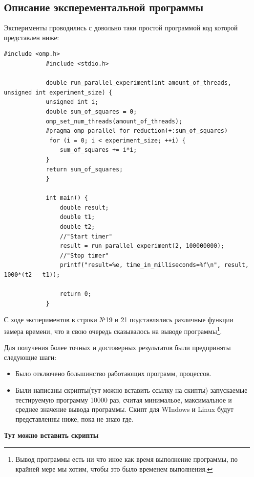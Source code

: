 \documentclass{article}
\begin{document}
		\subsection{Описание эксперементальной программы}
			Эксперименты проводились с довольно таки простой программой код которой представлен ниже:
			
			\begin{lstlisting}[label=some-code,caption=Тестовая программа]
			#include <omp.h>
			#include <stdio.h>
			
			double run_parallel_experiment(int amount_of_threads, unsigned int experiment_size) {
    		unsigned int i;
    		double sum_of_squares = 0;
    		omp_set_num_threads(amount_of_threads); 
    		#pragma omp parallel for reduction(+:sum_of_squares)
   			 for (i = 0; i < experiment_size; ++i) {
        		sum_of_squares += i*i;
    		}
   			return sum_of_squares;
			}

			int main() {
    			double result;
    			double t1;
    			double t2;
				//"Start timer"
    			result = run_parallel_experiment(2, 100000000);
				//"Stop timer"
    			printf("result=%e, time_in_milliseconds=%f\n", result, 1000*(t2 - t1));
    
    			return 0;
			}
		\end{lstlisting}
		\newpage
		
			С ходе экспериментов в строки №19 и 21 подставлялись различные функции замера времени, что в свою очередь сказывалось 		на выводе программы\footnote{Вывод программы есть ни что иное как время выполнение программы, по крайней мере мы 					хотим, чтобы это было временем выполнения.}.
			
			Для получения более точных и достоверных результатов были предприняты следующие шаги:
			
			\begin{itemize}
				\item Было отключено большинство работающих программ, процессов.
				\item Были написаны скрипты(тут можно вставить ссылку на скипты) запускаемые тестируемую программу 10000 раз, 							считая минимальое, максимальное и среднее значение вывода программы. Скипт для WIndows и Linux будут 								представленны ниже, пока не знаю где. 
			\end{itemize}			
		\begin{center}
			 \textbf{Тут можно вставить скрипты}
		\end{center}
			
\end{document}
